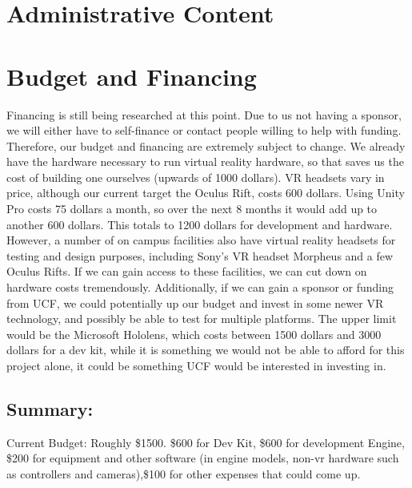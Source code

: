 \documentclass[a4paper,10pt,twoside]{article}
\begin{document}
\pagebreak

\section{Administrative Content}
\section{Budget and Financing}
			    Financing is still being researched at this point.  Due to us not having a sponsor, we will either have to self-finance or contact people willing to help with funding.  Therefore, our budget and financing are extremely subject to change. We already have the hardware necessary to run virtual reality hardware, so that saves us the cost of building one ourselves (upwards of 1000 dollars). VR headsets vary in price, although our current target the Oculus Rift, costs 600 dollars. Using Unity Pro costs 75 dollars a month, so over the next 8 months it would add up to another 600 dollars. This totals to 1200 dollars for development and hardware. However, a number of on campus facilities also have virtual 
			    reality headsets for testing and design purposes, including Sony’s VR headset Morpheus and a few Oculus Rifts.  If we can gain access to these facilities, we can cut down on hardware costs tremendously.  Additionally, if we can gain a sponsor or funding from UCF, we could potentially up our budget and invest in some newer VR 
			    technology, and possibly be able to test for multiple platforms. The upper limit would be the Microsoft Hololens, which costs between 1500 dollars and 3000 dollars for a dev kit, while it is something we would 
			    not be able to afford for this project alone, it could be something UCF would be interested in investing in.  
			    
			    \subsection{Summary:}
			    Current Budget: Roughly \$1500.  \$600 for Dev Kit,
			    \$600 for development Engine, \$200 for equipment and other software (in engine models, non-vr hardware such as controllers and cameras),\$100 for other
			    expenses that could come up.
			    
\end{document}
